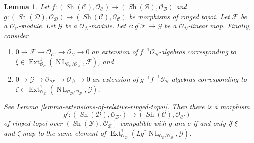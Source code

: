 \documentclass{stacks-project}
\theoremstyle{plain}
\newtheorem{lemma}[subsection]{Lemma}
\theoremstyle{definition}
\theoremstyle{remark}
\numberwithin{equation}{subsection}
\def\Ext{\mathop{\mathrm{Ext}}\nolimits}
\def\Sh{\mathop{\mathit{Sh}}\nolimits}
\def\NL{\mathop{N\!L}\nolimits}
\begin{document}
\begin{lemma}
\label{lemma-extensions-of-relative-ringed-topoi-functorial}
Let $f : (\Sh(\mathcal{C}), \mathcal{O}_\mathcal{C}) \to
(\Sh(\mathcal{B}), \mathcal{O}_\mathcal{B})$ and
$g : (\Sh(\mathcal{D}), \mathcal{O}_\mathcal{D}) \to
(\Sh(\mathcal{C}), \mathcal{O}_\mathcal{C})$ be morphisms
of ringed topoi. Let $\mathcal{F}$ be a $\mathcal{O}_\mathcal{C}$-module.
Let $\mathcal{G}$ be a $\mathcal{O}_\mathcal{D}$-module. Let
$c : g^*\mathcal{F} \to \mathcal{G}$ be a $\mathcal{O}_\mathcal{D}$-linear
map. Finally, consider
\begin{enumerate}
\item[(a)]
$0 \to \mathcal{F} \to \mathcal{O}_{\mathcal{C}'} \to
\mathcal{O}_\mathcal{C} \to 0$
an extension of $f^{-1}\mathcal{O}_\mathcal{B}$-algebras
corresponding to
$\xi \in \Ext^1_{\mathcal{O}_\mathcal{C}}(
\NL_{\mathcal{O}_\mathcal{C}/\mathcal{O}_\mathcal{B}}, \mathcal{F})$, and
\item[(b)]
$0 \to \mathcal{G} \to \mathcal{O}_{\mathcal{D}'} \to
\mathcal{O}_\mathcal{D} \to 0$
an extension of $g^{-1}f^{-1}\mathcal{O}_\mathcal{B}$-algebras
corresponding to
$\zeta \in \Ext^1_{\mathcal{O}_\mathcal{D}}(
\NL_{\mathcal{O}_\mathcal{D}/\mathcal{O}_\mathcal{B}}, \mathcal{G})$.
\end{enumerate}
See Lemma \ref{lemma-extensions-of-relative-ringed-topoi}.
Then there is a morphism
$$
g' :
(\Sh(\mathcal{D}), \mathcal{O}_{\mathcal{D}'})
\longrightarrow
(\Sh(\mathcal{C}), \mathcal{O}_{\mathcal{C}'})
$$
of ringed topoi over $(\Sh(\mathcal{B}), \mathcal{O}_\mathcal{B})$
compatible with $g$ and $c$ if and only if $\xi$ and $\zeta$
map to the same element of
$\Ext^1_{\mathcal{O}_\mathcal{D}}(
Lg^*\NL_{\mathcal{O}_\mathcal{C}/\mathcal{O}_\mathcal{B}}, \mathcal{G})$.
\end{lemma}
\end{document}

